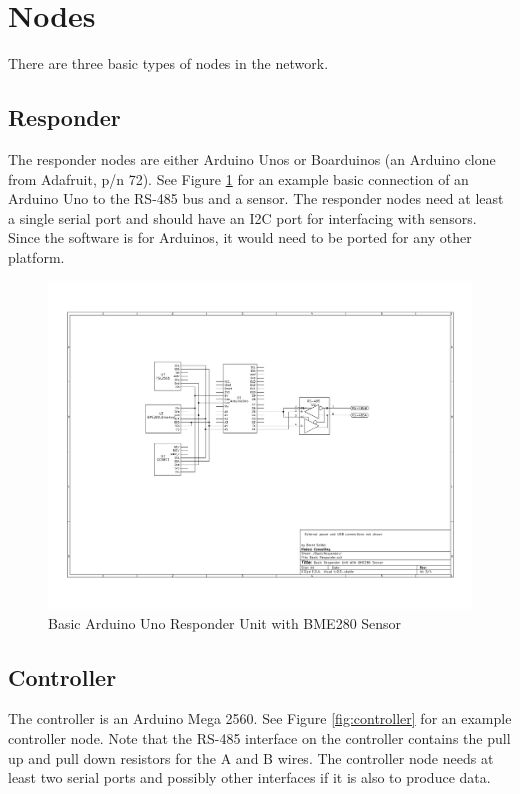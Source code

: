 \documentclass[10pt]{article}
\begin{document}
\section{Nodes}
There are three basic types of nodes in the network.

\subsection{Responder}
The responder nodes are either Arduino Unos or Boarduinos (an Arduino clone from Adafruit, p/n 72).  See Figure \ref{fig:basic} for an example basic connection of an Arduino Uno to the RS-485 bus and a sensor.  The responder nodes need at least a single serial port and should have an I2C port for interfacing with sensors.  Since the software is for Arduinos, it would need to be ported for any other platform.

\begin{figure}
  \centering
  \includegraphics[width=\textwidth]{ResponderUnit.pdf}
  \caption{Basic Arduino Uno Responder Unit with BME280 Sensor}
  \label{fig:basic}
\end{figure}

\subsection{Controller}
The controller is an Arduino Mega 2560.  See Figure \ref{fig:controller} for an example controller node.  Note that the RS-485 interface on the controller contains the pull up and pull down resistors for the A and B wires.  The controller node needs at least two serial ports and possibly other interfaces if it is also to produce data.
\end{document}
